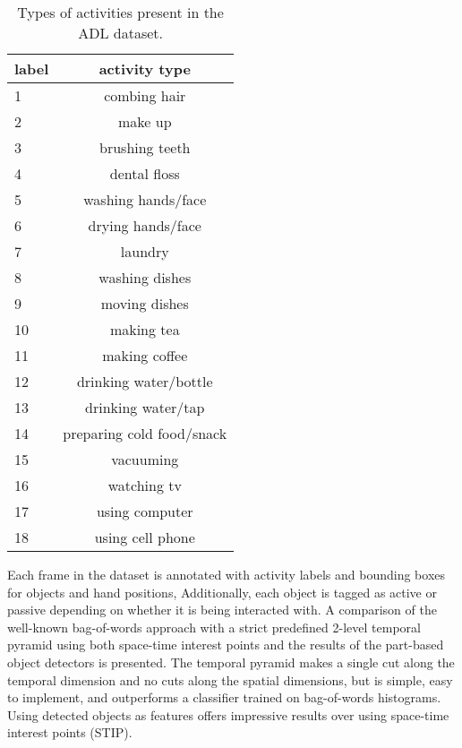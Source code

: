 \documentclass[10pt,twocolumn,letterpaper]{article}
\begin{document}
	\begin{table}
		\begin{center}
			\begin{tabular}{|l|c|}
				\hline \hline
        label & activity type \\
        \hline
        1 & combing hair \\
        \hline
        2 & make up \\
        \hline
        3 & brushing teeth \\
        \hline
        4 & dental floss \\
        \hline
        5 & washing hands/face \\
        \hline
        6 & drying hands/face \\
        \hline
        7 & laundry \\
        \hline
        8 & washing dishes \\
        \hline
        9 & moving dishes \\
        \hline
       10 & making tea \\
        \hline
       11 & making coffee \\
        \hline
       12 & drinking water/bottle \\
        \hline
       13 & drinking water/tap \\
        \hline
       14 & preparing cold food/snack \\
        \hline
       15 & vacuuming \\
        \hline
       16 & watching tv \\
        \hline
       17 & using computer \\
        \hline
       18 & using cell phone \\
				\hline
			\end{tabular}
		\end{center}
		\caption{Types of activities present in the ADL dataset.}
	\end{table}
  
	Each frame in the dataset
	is annotated with activity labels and bounding boxes for objects and hand positions, 
	Additionally, each object is tagged as active or passive depending
	on whether it is being interacted with.
  A comparison of the well-known bag-of-words approach with a strict
  predefined
  2-level temporal pyramid using both space-time interest points and the
  results of the part-based object detectors is presented. The temporal pyramid makes 
  a single cut along the temporal dimension and no cuts along the
  spatial dimensions, but is simple, easy to implement, and outperforms a 
  classifier trained on bag-of-words histograms. Using detected objects as
  features offers impressive results over using space-time interest points
  (STIP).
  
\end{document}
